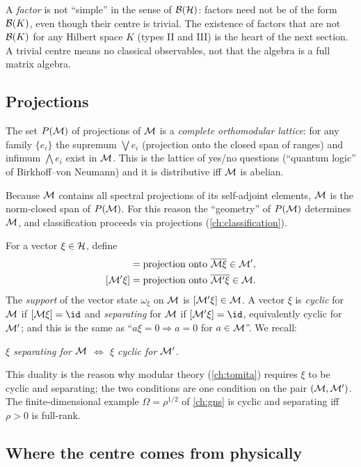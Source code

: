 \begin{whatwrong}
A \emph{factor} is not ``simple'' in the sense of $\mathcal{B}(\mathcal{H})$: factors need not be of the form $\mathcal{B}(K)$, even though their centre is trivial. The existence of factors that are not $\mathcal{B}(K)$ for any Hilbert space $K$ (types II and III) is the heart of the next section. A trivial centre means no classical observables, not that the algebra is a full matrix algebra.
\end{whatwrong}

\subsection{Projections}

The set $P(\mathcal{M})$ of projections of $\mathcal{M}$ is a \emph{complete orthomodular lattice}: for any family $\{e_i\}$ the supremum $\bigvee e_i$ (projection onto the closed span of ranges) and infimum $\bigwedge e_i$ exist in $\mathcal{M}$. This is the lattice of yes/no questions (``quantum logic'' of Birkhoff--von Neumann) and it is distributive iff $\mathcal{M}$ is abelian.

Because $\mathcal{M}$ contains all spectral projections of its self-adjoint elements, $\mathcal{M}$ is the norm-closed span of $P(\mathcal{M})$. For this reason the ``geometry'' of $P(\mathcal{M})$ determines $\mathcal{M}$, and classification proceeds via projections (\cref{ch:classification}).

For a vector $\xi\in\mathcal{H}$, define
\begin{align}
[\M\xi]&=\text{projection onto }\overline{\M\xi}\in\M',\\
[\M'\xi]&=\text{projection onto }\overline{\M'\xi}\in\M.
\end{align}
The \emph{support} of the vector state $\omega_\xi$ on $\mathcal{M}$ is $[\mathcal{M}'\xi]\in\mathcal{M}$. A vector $\xi$ is \emph{cyclic} for $\mathcal{M}$ if $[\M\xi]=\id$ and \emph{separating} for $\mathcal{M}$ if $[\M'\xi]=\id$, equivalently cyclic for $\mathcal{M}'$; and this is the same as ``$a\xi=0\Rightarrow a=0$ for $a\in\mathcal{M}$''. We recall:
\begin{center}
\emph{$\xi$ separating for $\mathcal{M}$ $\Longleftrightarrow$ $\xi$ cyclic for $\mathcal{M}'$.}
\end{center}
This duality is the reason why modular theory (\cref{ch:tomita}) requires $\xi$ to be cyclic and separating; the two conditions are one condition on the pair $(\mathcal{M},\mathcal{M}')$. The finite-dimensional example $\Omega=\rho^{1/2}$ of \cref{ch:gns} is cyclic and separating iff $\rho>0$ is full-rank.

\subsection{Where the centre comes from physically}

